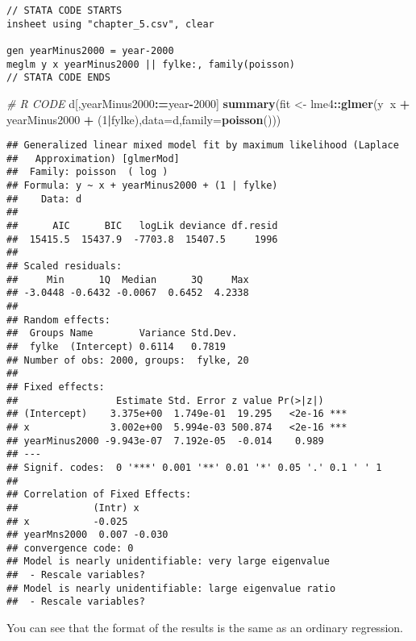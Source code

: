 \documentclass[]{book}
\newenvironment{Shaded}{\begin{snugshade}}{\end{snugshade}}
\newcommand{\KeywordTok}[1]{\textcolor[rgb]{0.13,0.29,0.53}{\textbf{#1}}}
\newcommand{\DataTypeTok}[1]{\textcolor[rgb]{0.13,0.29,0.53}{#1}}
\newcommand{\DecValTok}[1]{\textcolor[rgb]{0.00,0.00,0.81}{#1}}
\newcommand{\StringTok}[1]{\textcolor[rgb]{0.31,0.60,0.02}{#1}}
\newcommand{\CommentTok}[1]{\textcolor[rgb]{0.56,0.35,0.01}{\textit{#1}}}
\newcommand{\OperatorTok}[1]{\textcolor[rgb]{0.81,0.36,0.00}{\textbf{#1}}}
\newcommand{\ErrorTok}[1]{\textcolor[rgb]{0.64,0.00,0.00}{\textbf{#1}}}
\newcommand{\NormalTok}[1]{#1}
\begin{document}
\begin{verbatim}
// STATA CODE STARTS
insheet using "chapter_5.csv", clear

gen yearMinus2000 = year-2000
meglm y x yearMinus2000 || fylke:, family(poisson)
// STATA CODE ENDS
\end{verbatim}

\begin{Shaded}
\begin{Highlighting}[]
\CommentTok{# R CODE}
\NormalTok{d[,yearMinus2000}\OperatorTok{:}\ErrorTok{=}\NormalTok{year}\OperatorTok{-}\DecValTok{2000}\NormalTok{]}
\KeywordTok{summary}\NormalTok{(fit <-}\StringTok{ }\NormalTok{lme4}\OperatorTok{::}\KeywordTok{glmer}\NormalTok{(y}\OperatorTok{~}\NormalTok{x }\OperatorTok{+}\StringTok{ }\NormalTok{yearMinus2000 }\OperatorTok{+}\StringTok{ }\NormalTok{(}\DecValTok{1}\OperatorTok{|}\NormalTok{fylke),}\DataTypeTok{data=}\NormalTok{d,}\DataTypeTok{family=}\KeywordTok{poisson}\NormalTok{()))}
\end{Highlighting}
\end{Shaded}

\begin{verbatim}
## Generalized linear mixed model fit by maximum likelihood (Laplace
##   Approximation) [glmerMod]
##  Family: poisson  ( log )
## Formula: y ~ x + yearMinus2000 + (1 | fylke)
##    Data: d
## 
##      AIC      BIC   logLik deviance df.resid 
##  15415.5  15437.9  -7703.8  15407.5     1996 
## 
## Scaled residuals: 
##     Min      1Q  Median      3Q     Max 
## -3.0448 -0.6432 -0.0067  0.6452  4.2338 
## 
## Random effects:
##  Groups Name        Variance Std.Dev.
##  fylke  (Intercept) 0.6114   0.7819  
## Number of obs: 2000, groups:  fylke, 20
## 
## Fixed effects:
##                 Estimate Std. Error z value Pr(>|z|)    
## (Intercept)    3.375e+00  1.749e-01  19.295   <2e-16 ***
## x              3.002e+00  5.994e-03 500.874   <2e-16 ***
## yearMinus2000 -9.943e-07  7.192e-05  -0.014    0.989    
## ---
## Signif. codes:  0 '***' 0.001 '**' 0.01 '*' 0.05 '.' 0.1 ' ' 1
## 
## Correlation of Fixed Effects:
##             (Intr) x     
## x           -0.025       
## yearMns2000  0.007 -0.030
## convergence code: 0
## Model is nearly unidentifiable: very large eigenvalue
##  - Rescale variables?
## Model is nearly unidentifiable: large eigenvalue ratio
##  - Rescale variables?
\end{verbatim}

You can see that the format of the results is the same as an ordinary
regression.
\end{document}
